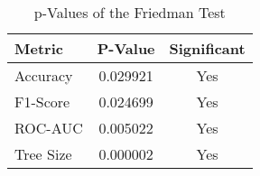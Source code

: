 
    \begin{table}[H]
        \centering
        \renewcommand{\arraystretch}{1.2}
        \caption{p-Values of the Friedman Test}
        \label{tab:RQ_Fitness_friedman}
    \begin{tabular}{lcc}
\toprule
Metric & P-Value & Significant \\
\midrule
Accuracy & 0.029921 & Yes \\
F1-Score & 0.024699 & Yes \\
ROC-AUC & 0.005022 & Yes \\
Tree Size & 0.000002 & Yes \\
\bottomrule
\end{tabular}

        
    \end{table}
    